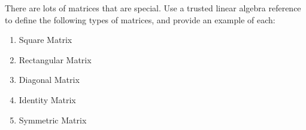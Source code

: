 \begin{prob}
There are lots of matrices that are special. Use a trusted linear algebra reference to define the following types of matrices, and provide an example of each:
\begin{enumerate}
\item Square Matrix
\item Rectangular Matrix
\item Diagonal Matrix
\item Identity Matrix
\item Symmetric Matrix
\end{enumerate}
\end{prob}

